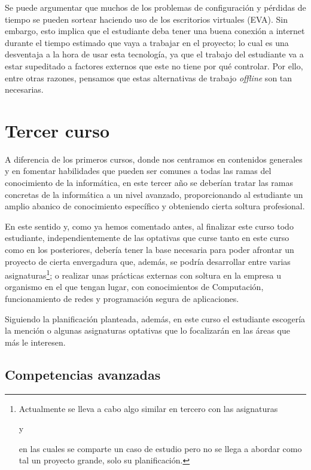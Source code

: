 Se puede argumentar que
muchos de los problemas de configuración y pérdidas de tiempo
se pueden sortear haciendo uso de los escritorios virtuales (EVA).
Sin embargo, esto implica que el estudiante deba tener
una buena conexión a internet durante el tiempo estimado que
vaya a trabajar en el proyecto;
lo cual es una desventaja a la hora de usar esta tecnología,
ya que el trabajo del estudiante va a estar supeditado a
factores externos que este no tiene por qué controlar.
Por ello, entre otras razones,
pensamos que estas alternativas de trabajo \emph{offline} son tan necesarias.

\section{Tercer curso}

A diferencia de los primeros cursos,
donde nos centramos en contenidos generales y en fomentar habilidades que
pueden ser comunes a todas las ramas del conocimiento de la informática,
en este tercer año
se deberían tratar las ramas concretas de la informática a un nivel avanzado,
proporcionando al estudiante un amplio abanico de conocimiento específico y
obteniendo cierta soltura profesional.

En este sentido y, como ya hemos comentado antes,
al finalizar este curso todo estudiante,
independientemente de las optativas que curse
tanto en este curso como en los posteriores,
debería tener la base necesaria para
poder afrontar un proyecto de cierta envergadura que, además,
se podría desarrollar entre varias asignaturas\footnote{
    Actualmente se lleva a cabo algo similar en tercero con las asignaturas
    \subject{Procesos de Desarrollo Software} y
    \subject{Gestión de Procesos de Desarrollo Software}
    en las cuales se comparte un caso de estudio pero
    no se llega a abordar como tal un proyecto grande, solo su planificación.
}; o realizar unas prácticas externas con soltura en la empresa u organismo
en el que tengan lugar,
con conocimientos de Computación,
funcionamiento de redes y
programación segura de aplicaciones.

Siguiendo la planificación planteada, además,
en este curso el estudiante escogería la mención o
algunas asignaturas optativas
que lo focalizarán en las áreas que más le interesen.

\subsection{Competencias avanzadas}

